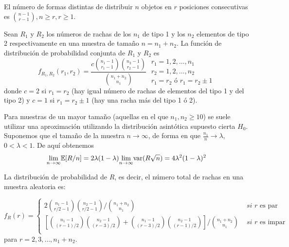 \begin{lema} 
	El número de formas distintas de distribuir $n$ objetos 
en $r$ posiciones consecutivas es ${n-1 \choose r-1}, n \geq 
r, r \geq 1$.
\end{lema}

\begin{teorema}
	Sean $R_1$ y $R_2$ los números de rachas de los $n_1$ de 
tipo 1 y los $n_2$ elementos de tipo 2 respectivamente en una 
muestra de tamaño $n = n_1 + n_2$. La función de distribución 
de probabilidad conjunta de $R_1$ y $R_2$ es
	\[ f_{R_1,R_2} (r_1, r_2) = 
		\frac{c {n_1 - 1 \choose r_1 - 1} 
				{n_2 - 1 \choose r_2 - 1}}
			{{n_1 + n_2 \choose n_1}}\;
		\begin{array}{l}
			r_1 = 1,2, \dots, n_1 \\
			r_2 = 1,2, \dots, n_2 \\
			r_1 = r_2 \text{ ó } r_1 = r_2 \pm 1
		\end{array}
	\]
	donde $c=2$ si $r_1 = r_2$ (hay igual número de rachas de 
elementos del tipo 1 y del tipo 2) y $c=1$ si $r_1 = 
r_2 \pm 1$ (hay una racha más del tipo 1 ó 2).
\end{teorema}

	Para muestras de un mayor tamaño (aquellas en el que 
$n_1, n_2 \geq 10$) se suele utilizar una aproximación 
utilizando la distribución asintótica supuesto cierta 
$H_0$.\\
	Suponemos que el tamaño de la muestra $n \rightarrow 
\infty$, de forma en que $\frac{n_1}{n} \rightarrow \lambda$, 
$0<\lambda<1$. De aquí obtenemos
	\[ \underset{n \rightarrow \infty}{\lim} \mathbb{E}[R/n] = 
			2\lambda (1-\lambda) 
				\underset{n \rightarrow \infty}{\lim} 
					\text{var}(R\sqrt{n}) =
			4\lambda^2(1-\lambda)^2
	\]
	
\begin{teorema}
	La distribución de probabilidad de $R$, es decir, el 
número total de rachas en una muestra aleatoria es:
	
	\begin{equation}
		f_R(r) = \left\lbrace\begin{array}{ll}
	2 {n_1-1 \choose r/2-1} {n_2-1 \choose r/2-1} 
		\big/ {n_1 + n_2 \choose n_1} &
			\textit{ si } r \text{ es par} \\
	\left[
		{n_1-1 \choose (r-1)/2} {n_2-1 \choose (r-3)/2} +  
		{n_1-1 \choose (r-3)/2} {n_2-1 \choose (r-1)/2} 
	\right]
		\big/ {n_1 + n_2 \choose n_1} &
			\textit{ si } r \text{ es impar} \\		
		\end{array}\right.
	\label{th-dist-R}
	\end{equation}
	para $r=2, 3, \dots, n_1 + n_2.$
\end{teorema}
	
